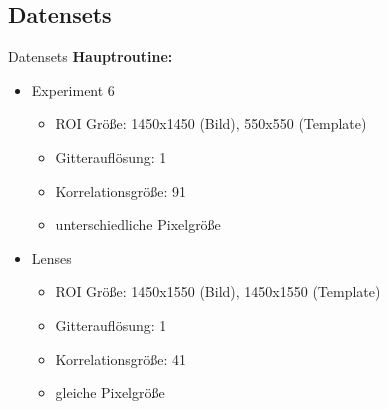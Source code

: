 \subsection{Datensets}
\begin{frame}{Datensets}
	\textbf{Hauptroutine:}
	\begin{itemize}
		\item<3-> Experiment 6
		\begin{itemize}
			\item ROI Größe: 1450x1450 (Bild), 550x550 (Template)
			\item Gitterauflösung: 1
			\item Korrelationsgröße: 91
			\item unterschiedliche Pixelgröße
		\end{itemize}
		\item<4-> Lenses
		\begin{itemize}
			\item ROI Größe: 1450x1550 (Bild), 1450x1550 (Template)
			\item Gitterauflösung: 1
			\item Korrelationsgröße: 41
			\item gleiche Pixelgröße
		\end{itemize}
	\end{itemize}
\end{frame}

